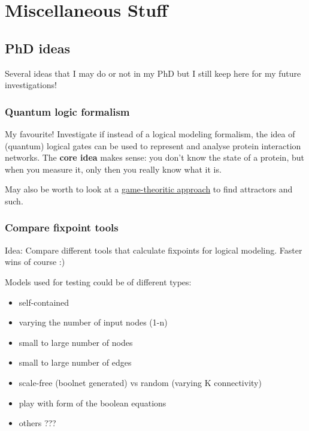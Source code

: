 \documentclass[
  12pt,
]{book}
\providecommand{\tightlist}{%
  \setlength{\itemsep}{0pt}\setlength{\parskip}{0pt}}
\begin{document}
\hypertarget{part-miscellaneous-stuff}{%
\part*{Miscellaneous Stuff}\label{part-miscellaneous-stuff}}

\hypertarget{ideas}{%
\chapter{PhD ideas}\label{ideas}}

Several ideas that I may do or not in my PhD but I still keep here for my future
investigations!

\hypertarget{quantum}{%
\section{Quantum logic formalism}\label{quantum}}

My favourite! Investigate if instead of a logical modeling formalism, the idea
of (quantum) logical gates can be used to represent and analyse protein interaction
networks.
The \textbf{core idea} makes sense: you don't know the state of a protein, but when
you measure it, only then you really know what it is.

May also be worth to look at a \href{https://doi.org/10.1007/11885191_18}{game-theoritic approach}
to find attractors and such.

\hypertarget{comp}{%
\section{Compare fixpoint tools}\label{comp}}

Idea: Compare different tools that calculate fixpoints for logical modeling.
Faster wins of course :)

Models used for testing could be of different types:

\begin{itemize}
\tightlist
\item
  self-contained
\item
  varying the number of input nodes (1-n)
\item
  small to large number of nodes
\item
  small to large number of edges
\item
  scale-free (boolnet generated) vs random (varying K connectivity)
\item
  play with form of the boolean equations
\item
  others ???
\end{itemize}
\end{document}
